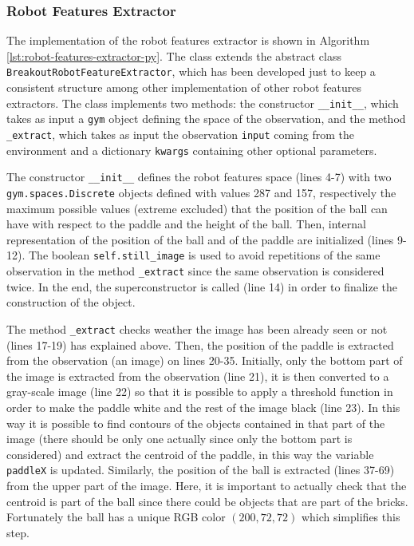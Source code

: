 \subsubsection{Robot Features Extractor}
The implementation of the robot features extractor is shown in Algorithm
\ref{lst:robot-features-extractor-py}. The class extends the abstract class
\texttt{BreakoutRobotFeatureExtractor}, which has been developed just to
keep a consistent structure among other implementation of other robot features
extractors. The class implements two methods: the constructor
\texttt{__init__}, which takes as input a \texttt{gym} object defining the space
of the observation, and the method \texttt{_extract}, which takes as input
the observation \texttt{input} coming from the environment and a dictionary
\texttt{kwargs} containing other optional parameters.

The constructor \texttt{__init__} defines the robot features space (lines 4-7)
with two \texttt{gym.spaces.Discrete} objects defined with values 287 and
157, respectively the maximum possible values (extreme excluded) that the
position of the ball can have with respect to the paddle and the height of the
ball. Then, internal representation of the position of the ball and of the
paddle are initialized (lines 9-12). The boolean \texttt{self.still_image}
is used to avoid repetitions of the same observation in the method
\texttt{_extract} since the same observation is considered twice. In the end,
the superconstructor is called (line 14) in order to finalize the
construction of the object.

The method \texttt{\_extract} checks weather the image has been already seen
or not (lines 17-19) has explained above. Then, the position of the paddle
is extracted from the observation (an image) on lines 20-35. Initially,
only the bottom part of the image is extracted from the observation (line 21),
it is then converted to a gray-scale image (line 22) so that it is possible
to apply a threshold function in order to make the paddle white and the
rest of the image black (line 23). In this way it is possible to find contours
of the objects contained in that part of the image (there should be only
one actually since only the bottom part is considered) and extract the centroid
of the paddle, in this way the variable
\texttt{paddleX} is updated. Similarly, the position of the ball is extracted
(lines 37-69) from the upper part of the image. Here, it is important to
actually check that the centroid is part of the ball since there could be
objects that are part of the bricks. Fortunately the ball has a unique RGB color
$(200, 72, 72)$ which simplifies this step.

